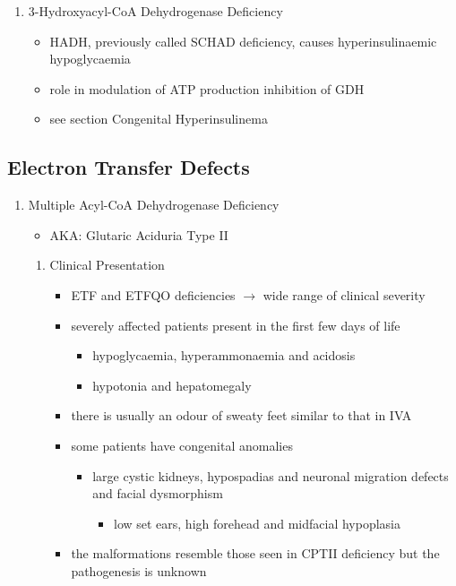 \documentclass{scrartcl}
\begin{document}
\begin{enumerate}
\item 3-Hydroxyacyl-CoA Dehydrogenase Deficiency
\label{sec:org72a0506}
\begin{itemize}
\item HADH, previously called SCHAD deficiency, causes hyperinsulinaemic
hypoglycaemia
\item role in modulation of ATP production inhibition of GDH
\item see section Congenital Hyperinsulinema
\end{itemize}
\end{enumerate}
\subsection{Electron Transfer Defects}
\label{sec:orgd786130}
\begin{enumerate}
\item Multiple Acyl-CoA Dehydrogenase Deficiency
\label{sec:org4dfd9de}
\begin{itemize}
\item AKA: Glutaric Aciduria Type II
\end{itemize}
\begin{enumerate}
\item Clinical Presentation
\label{sec:orge8b8225}
\begin{itemize}
\item ETF and ETFQO deficiencies \(\to\) wide range of clinical severity
\item severely affected patients present in the first few days of life
\begin{itemize}
\item hypoglycaemia, hyperammonaemia and acidosis
\item hypotonia and hepatomegaly
\end{itemize}
\item there is usually an odour of sweaty feet similar to that in IVA
\item some patients have congenital anomalies
\begin{itemize}
\item large cystic kidneys, hypospadias and neuronal migration defects and facial dysmorphism
\begin{itemize}
\item low set ears, high forehead and midfacial hypoplasia
\end{itemize}
\end{itemize}
\item the malformations resemble those seen in CPTII deficiency but the pathogenesis is unknown

\end{itemize}
\end{enumerate}
\end{enumerate}
\end{document}
